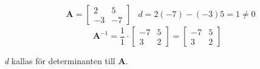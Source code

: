 \begin{Ex}
    \begin{align*}
    &\mathbf{A} = \begin{bmatrix} 2&5\\-3&-7 \end{bmatrix} &d = 2(-7) - (-3)5 = 1 \neq 0
    \end{align*}
    \[
        \mathbf{A}^{-1} = \frac{1}{1} \cdot \begin{bmatrix} -7&5\\3&2 \end{bmatrix} = \begin{bmatrix} -7&5\\3&2 \end{bmatrix}
    \]
    
\end{Ex}
\textit{d} kallas för determinanten till \textbf{A}.
